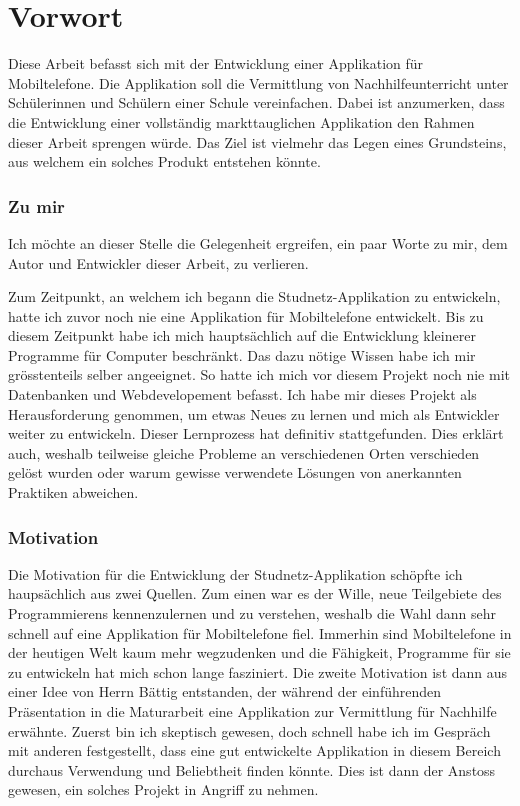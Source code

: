 \documentclass[../main.tex]{subfiles}
\begin{document}
\section*{Vorwort}
Diese Arbeit befasst sich mit der Entwicklung einer Applikation für Mobiltelefone. Die Applikation soll die Vermittlung von Nachhilfeunterricht unter Schülerinnen und Schülern einer Schule vereinfachen. Dabei ist anzumerken, dass die Entwicklung einer vollständig markttauglichen Applikation den Rahmen dieser Arbeit sprengen würde. Das Ziel ist vielmehr das Legen eines Grundsteins, aus welchem ein solches Produkt entstehen könnte.

\subsubsection*{Zu mir}
Ich möchte an dieser Stelle die Gelegenheit ergreifen, ein paar Worte zu mir, dem Autor und Entwickler dieser Arbeit, zu verlieren.
	
Zum Zeitpunkt, an welchem ich begann die Studnetz-Applikation zu entwickeln, hatte ich zuvor noch nie eine Applikation für Mobiltelefone entwickelt. Bis zu diesem Zeitpunkt habe ich mich hauptsächlich auf die Entwicklung kleinerer Programme für Computer beschränkt. Das dazu nötige Wissen habe ich mir grösstenteils selber angeeignet. So hatte ich mich vor diesem Projekt noch nie mit Datenbanken und Webdevelopement befasst. Ich habe mir dieses Projekt als Herausforderung genommen, um etwas Neues zu lernen und mich als Entwickler weiter zu entwickeln. Dieser Lernprozess hat definitiv stattgefunden. Dies erklärt auch, weshalb teilweise gleiche Probleme an verschiedenen Orten verschieden gelöst wurden oder warum gewisse verwendete Lösungen von anerkannten Praktiken abweichen.

\subsubsection*{Motivation}
Die Motivation für die Entwicklung der Studnetz-Applikation schöpfte ich haupsächlich aus zwei Quellen. Zum einen war es der Wille, neue Teilgebiete des Programmierens kennenzulernen und zu verstehen, weshalb die Wahl dann sehr schnell auf eine Applikation für Mobiltelefone fiel. Immerhin sind Mobiltelefone in der heutigen Welt kaum mehr wegzudenken und die Fähigkeit, Programme für sie zu entwickeln hat mich schon lange fasziniert. Die zweite Motivation ist dann aus einer Idee von Herrn Bättig entstanden, der während der einführenden Präsentation in die Maturarbeit eine Applikation zur Vermittlung für Nachhilfe erwähnte. Zuerst bin  ich skeptisch gewesen, doch schnell habe ich im Gespräch mit anderen festgestellt, dass eine gut entwickelte Applikation in diesem Bereich durchaus Verwendung und Beliebtheit finden könnte. Dies ist dann der Anstoss gewesen, ein solches Projekt in Angriff zu nehmen. 
	
\end{document}
